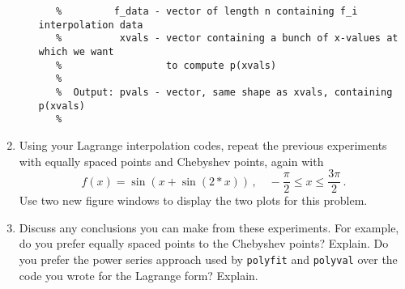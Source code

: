 \documentclass[12pt]{article}
\begin{document}
\begin{enumerate}
\begin{enumerate}
{\begin{verbatim}
   %         f_data - vector of length n containing f_i interpolation data
   %          xvals - vector containing a bunch of x-values at which we want
   %                  to compute p(xvals)
   %
   %  Output: pvals - vector, same shape as xvals, containing p(xvals)
   %
\end{verbatim}
}
\end{enumerate}
\item
Using your Lagrange interpolation codes, 
repeat the previous experiments with equally spaced points and Chebyshev points, again with
$$
   f(x) = \sin(x+\sin(2*x))\,, \quad -\frac{\pi}{2} \leq x \leq \frac{3\pi}{2}\,.
$$
Use two new figure windows to display the two plots for this problem.
\item
Discuss any conclusions you can make from these experiments. 
For example, do you prefer equally spaced points to the Chebyshev points? Explain.
Do you prefer the power series approach used by {\tt polyfit} and {\tt polyval} over the
code you wrote for the Lagrange form?  Explain.
\end{enumerate}
\end{document}
